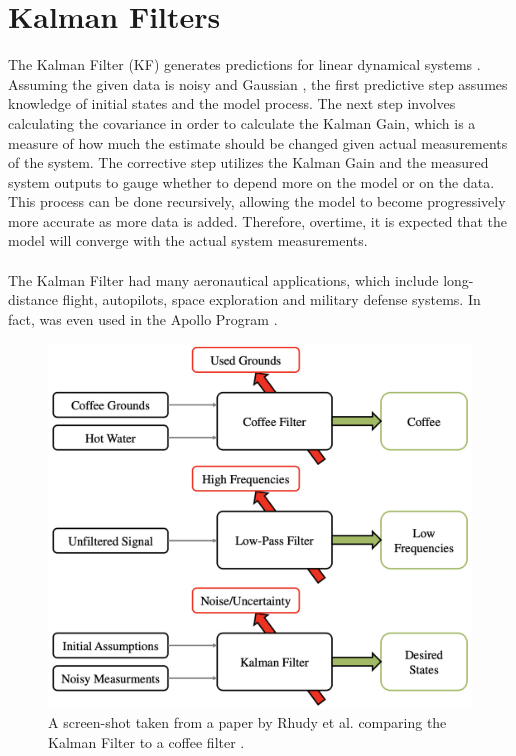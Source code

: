 \chapter{Kalman Filters}
\label{Kalman Filters}

The Kalman Filter (KF) generates predictions for linear dynamical systems \cite{inbook}. Assuming the given data is noisy and Gaussian \cite{inproceedings, article7}, the first predictive step assumes knowledge of initial states and the model process. The next step involves calculating the covariance in order to calculate the Kalman Gain, which is a measure of how much the estimate should be changed given actual measurements of the system. The corrective step utilizes the Kalman Gain and the measured system outputs to gauge whether to depend more on the model or on the data. This process can be done recursively, allowing the model to become progressively more accurate as more data is added. Therefore, overtime, it is expected that the model will converge with the actual system measurements.
\\  \\
The Kalman Filter had many aeronautical applications, which include long-distance flight, autopilots, space exploration and military defense systems. In fact, was even used in the Apollo Program  \cite{kalmanbio}. 

\begin{figure}[h]
    \centering
    \includegraphics[scale = 0.4]{coffee.png}
    \caption{A screen-shot taken from a paper by Rhudy et al. comparing the Kalman Filter to a coffee filter \cite{article7}.}
    \label{coffee}
\end{figure}

